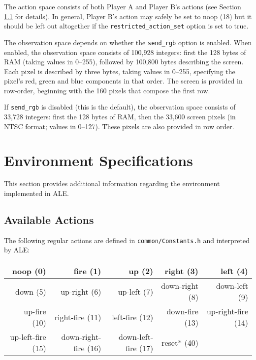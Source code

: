 \documentclass[12pt]{article}
\begin{document}
The action space consists of both Player A and Player B's actions (see Section 
\ref{sec:available_actions}
for details). In general, Player B's action may safely be set to noop (18) but it should be left out
altogether if the \verb+restricted_action_set+ option is set to true. 

The observation space depends on whether the \verb+send_rgb+ option is enabled. 
 When enabled, the observation space consists of 100,928 
 integers: first the 128 bytes of RAM (taking values in 0--255), followed by 100,800 bytes 
 describing the screen.
 Each pixel is described by three bytes, taking values in 0--255, specifying the pixel's 
 red, green and blue components in that order. The screen is provided in row-order, 
beginning with the 160 pixels that compose the first row.
 
If \verb+send_rgb+ is disabled (this is the default), the observation space consists of 33,728 integers: first the 128 bytes of RAM, then the 33,600 screen pixels (in NTSC format; values in 0--127).
These pixels are also provided in row order.

\section{Environment Specifications}\label{sec:environment_specifications}

This section provides additional information regarding the environment implemented in ALE.

\subsection{Available Actions}\label{sec:available_actions}

The following regular actions are defined in \verb+common/Constants.h+ and interpreted by ALE:

\begin{center}
\small{
\begin{tabular}{|r|r|r|r|r|}
\hline
noop (0) & fire (1) & up (2) & right (3) & left (4) \\
\hline
down (5) & up-right (6) & up-left (7) & down-right (8) & down-left (9) \\
\hline
up-fire (10) & right-fire (11) & left-fire (12) & down-fire (13) & up-right-fire (14) \\
\hline
up-left-fire (15) & down-right-fire (16) & down-left-fire (17) & reset* (40) & \\
\hline
\end{tabular}
}
\end{center}
\end{document}
